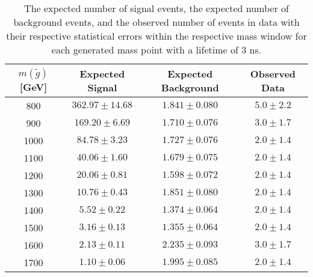 \begin{table}[!htbp]
  \begin{center}
    \begin{tabular}{cccc}
      \hline
      $m(\tilde{g})$ [GeV]  & Expected Signal & Expected Background & Observed Data\\ 
      \hline
      800    & $362.97 \pm 14.68 $ & $1.841 \pm 0.080 $ & $5.0 \pm 2.2$ \\
      900    & $169.20 \pm 6.69 $ & $1.710 \pm 0.076 $ & $3.0 \pm 1.7$ \\
      1000    & $84.78 \pm 3.23 $ & $1.727 \pm 0.076 $ & $2.0 \pm 1.4$ \\
      1100    & $40.06 \pm 1.60 $ & $1.679 \pm 0.075 $ & $2.0 \pm 1.4$ \\
      1200    & $20.06 \pm 0.81 $ & $1.598 \pm 0.072 $ & $2.0 \pm 1.4$ \\
      1300    & $10.76 \pm 0.43 $ & $1.851 \pm 0.080 $ & $2.0 \pm 1.4$ \\
      1400    & $5.52 \pm 0.22 $ & $1.374 \pm 0.064 $ & $2.0 \pm 1.4$ \\
      1500    & $3.16 \pm 0.13 $ & $1.355 \pm 0.064 $ & $2.0 \pm 1.4$ \\
      1600    & $2.13 \pm 0.11 $ & $2.235 \pm 0.093 $ & $3.0 \pm 1.7$ \\
      1700    & $1.10 \pm 0.06 $ & $1.995 \pm 0.085 $ & $2.0 \pm 1.4$ \\
      \hline
    \end{tabular}
  \end{center}
  \caption{The expected number of signal events, the expected number of background events, and the observed number of events in data with their respective statistical errors within the respective mass window for each generated mass point with a lifetime of 3 ns.}
  \label{tab:app_counts_3ns}
\end{table}


